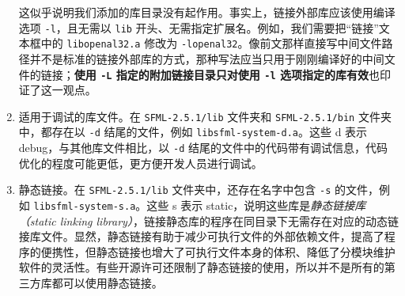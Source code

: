 \begin{enumerate}
	这似乎说明我们添加的库目录没有起作用。事实上，链接外部库应该使用编译选项 \lstinline[language={}]{-l}，且无需以 \lstinline[language={}]{lib} 开头、无需指定扩展名。例如，我们需要把“链接”文本框中的 \lstinline[language={}]{libopenal32.a} 修改为 \lstinline[language={}]{-lopenal32}。像前文那样直接写中间文件路径并不是标准的链接外部库的方式，那种写法应当只用于刚刚编译好的中间文件的链接；\textbf{使用 \lstinline[language={}]{-L} 指定的附加链接目录只对使用 \lstinline[language={}]{-l} 选项指定的库有效}也印证了这一观点。

	\item 适用于调试的库文件。在 \lstinline[language={}]{SFML-2.5.1/lib} 文件夹和 \lstinline[language={}]{SFML-2.5.1/bin} 文件夹中，都存在以 \lstinline[language={}]{-d} 结尾的文件，例如 \lstinline[language={}]{libsfml-system-d.a}。这些 d 表示 debug，与其他库文件相比，以 \lstinline[language={}]{-d} 结尾的文件中的代码带有调试信息，代码优化的程度可能更低，更方便开发人员进行调试。

	\item 静态链接。在 \lstinline[language={}]{SFML-2.5.1/lib} 文件夹中，还存在名字中包含 \lstinline[language={}]{-s} 的文件，例如 \lstinline[language={}]{libsfml-system-s.a}。这些 s 表示 static，说明这些库是\emph{静态链接库（static linking library）}，链接静态库的程序在同目录下无需存在对应的动态链接库文件。显然，静态链接有助于减少可执行文件的外部依赖文件，提高了程序的便携性，但静态链接也增大了可执行文件本身的体积、降低了分模块维护软件的灵活性。有些开源许可还限制了静态链接的使用，所以并不是所有的第三方库都可以使用静态链接。
\end{enumerate}
